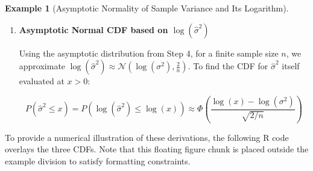\documentclass[
  letterpaper,
  DIV=11,
  numbers=noendperiod]{scrreprt}
\renewcommand{\[}{\begin{equation}}
\renewcommand{\]}{\end{equation}}
\theoremstyle{definition}
\theoremstyle{plain}
\theoremstyle{plain}
\theoremstyle{plain}
\theoremstyle{definition}
\newtheorem{example}{Example}[chapter]
\theoremstyle{plain}
\theoremstyle{remark}
\begin{document}
\begin{example}[Asymptotic Normality of Sample Variance and Its
Logarithm]
\begin{enumerate}
  \[
  P(\hat{\sigma}^2 \le x) \approx \Phi\left(\frac{x - \sigma^2}{\sqrt{2\sigma^4/n}}\right)
  \]
\item
  \textbf{Asymptotic Normal CDF based on \(\log(\hat{\sigma}^2)\)}

  Using the asymptotic distribution from Step 4, for a finite sample
  size \(n\), we approximate
  \(\log(\hat{\sigma}^2) \approx \mathcal{N}(\log(\sigma^2), \frac{2}{n})\).
  To find the CDF for \(\hat{\sigma}^2\) itself evaluated at \(x > 0\):

  \[
  P(\hat{\sigma}^2 \le x) = P(\log(\hat{\sigma}^2) \le \log(x)) \approx \Phi\left(\frac{\log(x) - \log(\sigma^2)}{\sqrt{2/n}}\right)
  \]
\end{enumerate}

\end{example}

To provide a numerical illustration of these derivations, the following
R code overlays the three CDFs. Note that this floating figure chunk is
placed outside the example division to satisfy formatting constraints.
\end{document}
